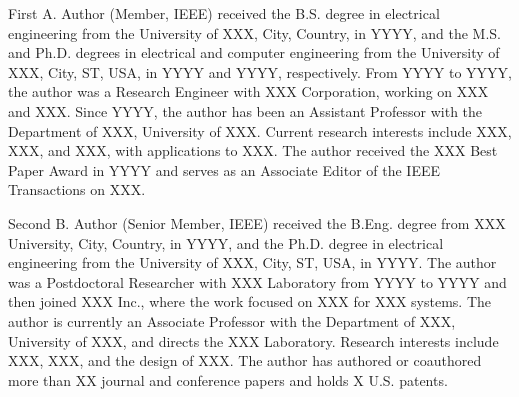 
\begin{IEEEbiography}{First A. Author}
(Member, IEEE) received the B.S. degree in electrical engineering from the University of XXX, City, Country, in YYYY, and the M.S. and Ph.D. degrees in electrical and computer engineering from the University of XXX, City, ST, USA, in YYYY and YYYY, respectively. From YYYY to YYYY, the author was a Research Engineer with XXX Corporation, working on XXX and XXX. Since YYYY, the author has been an Assistant Professor with the Department of XXX, University of XXX. Current research interests include XXX, XXX, and XXX, with applications to XXX. The author received the XXX Best Paper Award in YYYY and serves as an Associate Editor of the IEEE Transactions on XXX.
\end{IEEEbiography}

\begin{IEEEbiography}{Second B. Author}
(Senior Member, IEEE) received the B.Eng. degree from XXX University, City, Country, in YYYY, and the Ph.D. degree in electrical engineering from the University of XXX, City, ST, USA, in YYYY. The author was a Postdoctoral Researcher with XXX Laboratory from YYYY to YYYY and then joined XXX Inc., where the work focused on XXX for XXX systems. The author is currently an Associate Professor with the Department of XXX, University of XXX, and directs the XXX Laboratory. Research interests include XXX, XXX, and the design of XXX. The author has authored or coauthored more than XX journal and conference papers and holds X U.S. patents.
\end{IEEEbiography}

